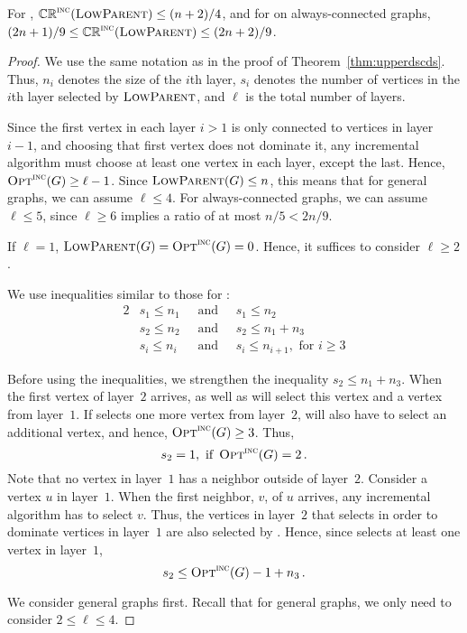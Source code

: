 \begin{theorem}
For \tds, $\mathbb{CR}^{\textsc{\ensuremath{\text{inc}}}}(\operatorname{\textsc{LowParent}}) \leq (n+2)/4$, and for \tds on
always-connected graphs, $(2n+1)/9 \leq \mathbb{CR}^{\textsc{\ensuremath{\text{inc}}}}(\operatorname{\textsc{LowParent}}) \leq
(2n+2)/9$.
\end{theorem}
\begin{proof}
We use the same notation as in the proof of
Theorem~\ref{thm:upperdscds}.
Thus, $n_i$ denotes the size of the $i$th layer, $s_i$ denotes the
number of vertices in the $i$th layer selected by $\operatorname{\textsc{LowParent}}$,
and $\ell$ is the total number of layers.

Since the first vertex in each layer $i>1$ is only connected to vertices in
layer $i-1$, and choosing that first vertex does not dominate it, any 
incremental algorithm must choose at least one vertex
in each layer, except the last.
Hence, $\operatorname{\textsc{Opt}}^\textsc{\ensuremath{\text{inc}}}(G) \ge \ell-1$.
Since $\operatorname{\textsc{LowParent}}(G) \leq n$, this means that for general graphs,
we can assume $\ell \leq 4$.
For always-connected graphs, we can assume $\ell \leq 5$, since $\ell
\geq 6$ implies a ratio of at most $n/5 < 2n/9$.

If $\ell=1$, $\operatorname{\textsc{LowParent}}(G)=\operatorname{\textsc{Opt}}^\textsc{\ensuremath{\text{inc}}}(G)=0$.
Hence, it suffices to consider $\ell \geq 2$.

We use inequalities similar to those for \ds:
\begin{alignat*}{2}
& s_1 \leq n_1 \; & \text{ and } \; & s_1 \leq n_2\\
& s_2 \leq n_2 \; & \text{ and } \; & s_2 \leq n_1 + n_3\\
& s_i \leq n_i \; & \text{ and } \; & s_i \leq n_{i+1}, \text{ for } i
  \geq 3
\end{alignat*}

Before using the inequalities, we strengthen the inequality $s_2 \leq
n_1+n_3$.
When the first vertex of layer~$2$ arrives, \onopt as well as
\alayersparent will select this vertex and a vertex from layer~$1$.
If \alayersparent selects one more vertex from layer~$2$, \onopt will
also have to select an additional vertex, and hence, $\operatorname{\textsc{Opt}}^\textsc{\ensuremath{\text{inc}}}(G) \geq 3$.
Thus,
 $$s_2=1, \text{ if } \operatorname{\textsc{Opt}}^\textsc{\ensuremath{\text{inc}}}(G) = 2 \,.$$
Note that no vertex in layer~$1$ has a neighbor outside of layer~$2$.
Consider a vertex $u$ in layer~$1$.
When the first neighbor, $v$, of $u$ arrives, any incremental
algorithm has to select $v$.
Thus, the vertices in layer~$2$ that \alayersparent selects in
order to dominate vertices in layer~$1$ are also selected by \onopt.
Hence, since \onopt selects at least one vertex in layer~$1$, 
 $$s_2 \leq \operatorname{\textsc{Opt}}^\textsc{\ensuremath{\text{inc}}}(G)-1 + n_3\,.$$

We consider general graphs first.
Recall that for general graphs, we only need to consider $2 \leq \ell
\leq 4$.


\end{proof}
